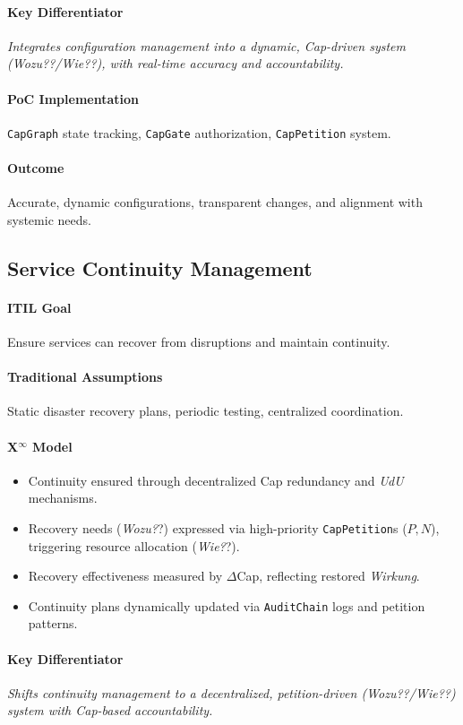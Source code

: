 \documentclass[12pt, a4paper]{scrartcl}
\newcommand{\Xinf}{X$^\infty$}                        %
\newcommand{\DeltaCap}{$\Delta$Cap}                    %
\newcommand{\Wirkung}{\textit{Wirkung}}                 %
\newcommand{\CapGate}{\texttt{CapGate}}
\newcommand{\AuditChain}{\texttt{AuditChain}}
\newcommand{\CapPetition}{\texttt{CapPetition}}        %
\newcommand{\UdU}{\textit{UdU}} %
\newcommand{\Wozu}{\textit{Wozu?}}                      %
\newcommand{\Wie}{\textit{Wie?}}                        %
\begin{document}
\paragraph{Key Differentiator} \textit{Integrates configuration management into a dynamic, Cap-driven system (\Wozu?/\Wie?), with real-time accuracy and accountability.}
\paragraph{PoC Implementation} \texttt{CapGraph} state tracking, \CapGate{} authorization, \CapPetition{} system.
\paragraph{Outcome} Accurate, dynamic configurations, transparent changes, and alignment with systemic needs.

\subsection{Service Continuity Management} %
\paragraph{ITIL Goal} Ensure services can recover from disruptions and maintain continuity.
\paragraph{Traditional Assumptions} Static disaster recovery plans, periodic testing, centralized coordination.
\paragraph*{\Xinf{} Model}
\begin{itemize}
    \item Continuity ensured through decentralized Cap redundancy and \UdU{} mechanisms.
    \item Recovery needs (\Wozu?) expressed via high-priority \CapPetition{}s ($P, N$), triggering resource allocation (\Wie?).
    \item Recovery effectiveness measured by \DeltaCap{}, reflecting restored \Wirkung{}.
    \item Continuity plans dynamically updated via \AuditChain{} logs and petition patterns.
\end{itemize}
\paragraph{Key Differentiator} \textit{Shifts continuity management to a decentralized, petition-driven (\Wozu?/\Wie?) system with Cap-based accountability.}
\end{document}
